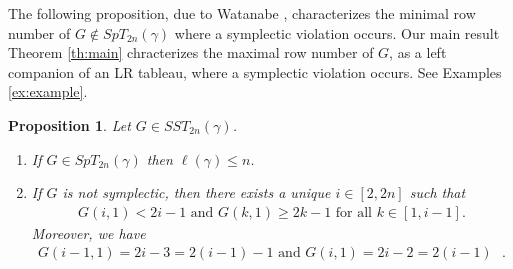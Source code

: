 \documentclass[reqno]{amsart}
\theoremstyle{tplain}
\newtheorem{prop}{Proposition}
\begin{document}
{The following proposition, due to Watanabe \cite{watanabe}, characterizes the minimal row number of $G\notin SpT_{2n}(\gamma)$ where a symplectic violation occurs.
Our  main result Theorem \ref{th:main} chracterizes the maximal row number of $G$, as a left companion of an LR  tableau, where a symplectic violation occurs. See Examples \ref{ex:example}.
\begin{prop} \cite{watanabe} %
Let $G \in SST_{2n}(\gamma)$.
\begin{enumerate}
\item If $G\in SpT_{2n}(\gamma)$ then $\ell(\gamma)\le n$.
\item If $G$ is not symplectic, then there exists a unique
$i \in[2, 2n]$ such that
\begin{align}G(i, 1) < 2i -1 \mbox{ and } G(k, 1) \ge 2k -1  \mbox{ for all $k \in [1, i -1 ]$}.\end{align}
Moreover, we have
\begin{align}G(i - 1, 1) = 2i - 3=2(i-1)-1  \mbox{  and $G(i, 1) = 2i -2=2(i-1)$ }.\end{align}
\end{enumerate}
\end{prop}


}
\end{document}
